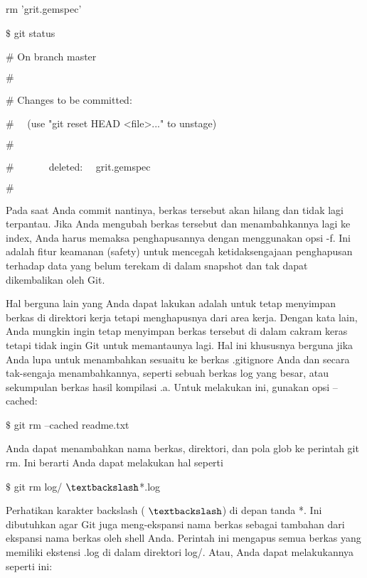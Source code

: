 \noindent 
rm 'grit.gemspec' \par
\noindent 
 $  \$  $ git status \par
\noindent 
 $  \#  $ On branch master \par
\noindent 
 $  \#  $ \par
\noindent 
 $  \#  $ Changes to be committed: \par
\noindent 
 $  \#  $~~ (use "git reset HEAD <file>..." to unstage) \par
\noindent 
 $  \#  $ \par
\noindent 
 $  \#  $~~~~~~~deleted:~~  grit.gemspec \par
\noindent 
 $  \#  $ \par
\vspace{12pt}
\vspace{12pt}
\noindent 
Pada saat Anda commit nantinya, berkas tersebut akan hilang dan tidak lagi terpantau. Jika Anda mengubah berkas tersebut dan menambahkannya lagi ke index, Anda harus memaksa penghapusannya dengan menggunakan opsi -f. Ini adalah fitur keamanan (safety) untuk mencegah ketidaksengajaan penghapusan terhadap data yang belum terekam di dalam snapshot dan tak dapat dikembalikan oleh Git. \par
\noindent 
Hal berguna lain yang Anda dapat lakukan adalah untuk tetap menyimpan berkas di direktori kerja tetapi menghapusnya dari area kerja. Dengan kata lain, Anda mungkin ingin tetap menyimpan berkas tersebut di dalam cakram keras tetapi tidak ingin Git untuk memantaunya lagi. Hal ini khususnya berguna jika Anda lupa untuk menambahkan sesuaitu ke berkas .gitignore Anda dan secara tak-sengaja menambahkannya, seperti sebuah berkas log yang besar, atau sekumpulan berkas hasil kompilasi .a. Untuk melakukan ini, gunakan opsi --cached: \par
\vspace{12pt}
\noindent 
 $  \$  $ git rm --cached readme.txt \par
\noindent 
Anda dapat menambahkan nama berkas, direktori, dan pola glob ke perintah git rm. Ini berarti Anda dapat melakukan hal seperti \par
\vspace{12pt}
\noindent 
 $  \$  $ git rm log/ $  \textbackslash  $*.log \par
\noindent 
Perhatikan karakter backslash ( $  \textbackslash  $) di depan tanda *. Ini dibutuhkan agar Git juga meng-ekspansi nama berkas sebagai tambahan dari ekspansi nama berkas oleh shell Anda. Perintah ini mengapus semua berkas yang memiliki ekstensi .log di dalam direktori log/. Atau, Anda dapat melakukannya seperti ini: \par

